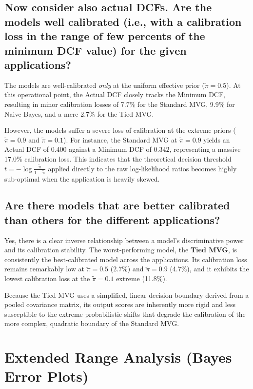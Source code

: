 \subsection*{Now consider also actual DCFs. Are the models well calibrated (i.e., with a calibration loss in the range of few percents of the minimum DCF value) for the given applications?}

The models are well-calibrated \textit{only} at the uniform effective prior ($\tilde{\pi} = 0.5$). At this operational point, the Actual DCF closely tracks the Minimum DCF, resulting in minor calibration losses of 7.7\% for the Standard MVG, 9.9\% for Naive Bayes, and a mere 2.7\% for the Tied MVG. 

However, the models suffer a severe loss of calibration at the extreme priors ($\tilde{\pi} = 0.9$ and $\tilde{\pi} = 0.1$). For instance, the Standard MVG at $\tilde{\pi} = 0.9$ yields an Actual DCF of $0.400$ against a Minimum DCF of $0.342$, representing a massive 17.0\% calibration loss. This indicates that the theoretical decision threshold $t = -\log \frac{\tilde{\pi}}{1 - \tilde{\pi}}$ applied directly to the raw log-likelihood ratios becomes highly sub-optimal when the application is heavily skewed.

\subsection*{Are there models that are better calibrated than others for the different applications?}

Yes, there is a clear inverse relationship between a model's discriminative power and its calibration stability. The worst-performing model, the \textbf{Tied MVG}, is consistently the best-calibrated model across the applications. Its calibration loss remains remarkably low at $\tilde{\pi} = 0.5$ (2.7\%) and $\tilde{\pi} = 0.9$ (4.7\%), and it exhibits the lowest calibration loss at the $\tilde{\pi} = 0.1$ extreme (11.8\%). 

Because the Tied MVG uses a simplified, linear decision boundary derived from a pooled covariance matrix, its output scores are inherently more rigid and less susceptible to the extreme probabilistic shifts that degrade the calibration of the more complex, quadratic boundary of the Standard MVG.

\section{Extended Range Analysis (Bayes Error Plots)}

